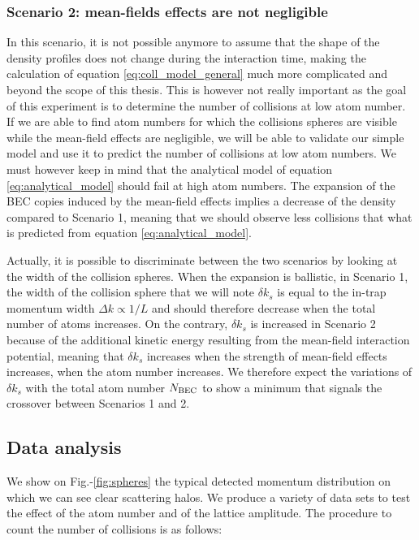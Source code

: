 \subsubsection{Scenario 2: mean-fields effects are not negligible}

In this scenario, it is not possible anymore to assume that the shape of the density profiles does not change during the interaction time, making the calculation of equation \ref{eq:coll_model_general} much more complicated and beyond the scope of this thesis. This is however not really important as the goal of this experiment is to determine the number of collisions at low atom number. If we are able to find atom numbers for which the collisions spheres are visible while the mean-field effects are negligible, we will be able to validate our simple model and use it to predict the number of collisions at low atom numbers. We must however keep in mind that the analytical model of equation \ref{eq:analytical_model} should fail at high atom numbers. The expansion of the BEC copies induced by the mean-field effects implies a decrease of the density compared to Scenario 1, meaning that we should observe less collisions that what is predicted from equation \ref{eq:analytical_model}.

Actually, it is possible to discriminate between the two scenarios by looking at the width of the collision spheres. When the expansion is ballistic, \ie in Scenario 1, the width of the collision sphere that we will note $\delta k_s$ is equal to the in-trap momentum width $\Delta k \propto 1/L$ and should therefore decrease when the total number of atoms increases. On the contrary, $\delta k_s$ is increased in Scenario 2 because of the additional kinetic energy resulting from the mean-field interaction potential, meaning that $\delta k_s$ increases when the strength of mean-field effects increases, \ie when the atom number increases. We therefore expect the variations of $\delta k_s$ with the total atom number $N_{\rm{BEC}}$ to show a minimum that signals the crossover between Scenarios 1 and 2.

\subsection{Data analysis}

\label{sec:data_analysis_collisions}

We show on Fig.-\ref{fig:spheres} the typical detected momentum distribution on which we can see clear scattering halos. We produce a variety of data sets to test the effect of the atom number and of the lattice amplitude. The procedure to count the number of collisions is as follows:

